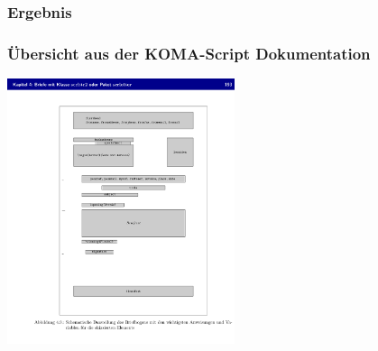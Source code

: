 \documentclass[12pt,ngerman]{beamer}
\begin{document}
\begin{frame}[plain]
\frametitle{Ergebnis}

\vspace*{-0.75cm}\begin{center}
\end{center}
\end{frame}


\begin{frame}[plain]
\frametitle{Übersicht aus der KOMA-Script Dokumentation}

\begin{center}
\includegraphics[width=0.5\textwidth]{scrguide193}
\end{center}
\end{frame}
\end{document}
